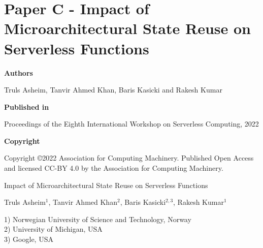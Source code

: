 \documentclass[../../../main.tex]{subfiles}
\begin{document}
\chapter{Paper C - Impact of Microarchitectural State Reuse on Serverless Functions}
\label{chap:wosc-paper}

\noindent \textbf{Authors}

\vspace*{0.3cm}

\noindent Truls Asheim, Tanvir Ahmed Khan, Baris Kasicki and Rakesh Kumar

\vspace*{0.7cm}

\noindent \textbf{Published in}

\vspace*{0.3cm}

\noindent Proceedings of the Eighth International Workshop on Serverless Computing, 2022

\vspace*{0.7cm}

\noindent \textbf{Copyright}

\vspace*{0.3cm}

\noindent Copyright ©2022 Association for Computing Machinery. Published Open Access and licensed CC-BY 4.0 by the Association for Computing Machinery.

\newpage

\vspace*{0.1cm}

\begin{center}

\Huge{Impact of Microarchitectural State Reuse on Serverless Functions}

\vspace{0.6cm}

\large{Truls Asheim$^{1}$, Tanvir Ahmed Khan$^{2}$, Baris Kasicki$^{2,3}$, Rakesh Kumar$^{1}$}

\vspace{0.1cm}

\small{1) Norwegian University of Science and Technology, Norway}\\
\small{2) University of Michigan, USA}\\
\small{3) Google, USA}\\


\end{center}

\vspace{0.2cm}
\end{document}
